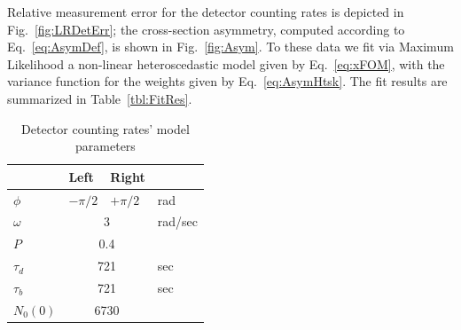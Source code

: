 \documentclass[a4paper]{jacow}
\newcommand{\LTb}{\tau_b}
\newcommand{\LTd}{\tau_d}
\begin{document}
Relative measurement error for the detector counting rates is depicted in Fig.~\ref{fig:LRDetErr}; the cross-section asymmetry, computed according to Eq.~\eqref{eq:AsymDef}, is shown in Fig.~\ref{fig:Asym}.
To these data we fit via Maximum Likelihood a non-linear heteroscedastic model %
given by Eq.~\eqref{eq:xFOM}, with the variance function for the weights given by Eq.~\eqref{eq:AsymHtsk}. The fit results are summarized in Table~\ref{tbl:FitRes}.
\begin{table}[h]
	\caption{Detector counting rates' model parameters\label{tbl:DetCntRtParam}}
	\centering
	\begin{tabular}{llll}
		\hline
		&   Left   &     Right     &  \\ \hline
		$\phi$  & $-\pi/2$ &   $+\pi/2$    &   rad   \\
		$\omega$ &  \multicolumn{2}{c}{3}   & rad/sec \\
		$P$    & \multicolumn{2}{c}{0.4}  &  \\
		$\LTd$  & \multicolumn{2}{c}{721}  &   sec   \\
		$\LTb$  & \multicolumn{2}{c}{721}  &   sec   \\
		$N_0(0)$ & \multicolumn{2}{c}{6730} &  \\ \hline
	\end{tabular}
\end{table}
\end{document}
